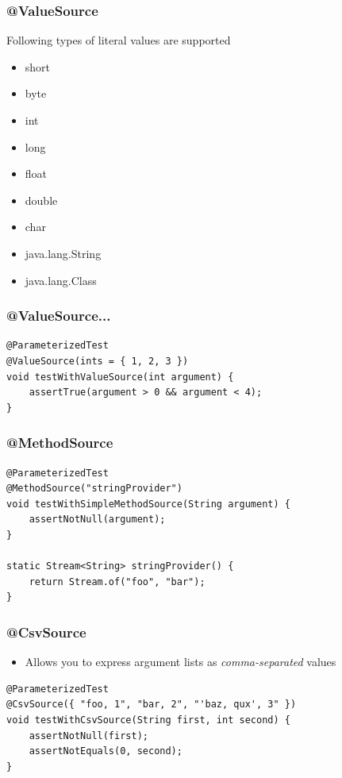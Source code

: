 \documentclass{beamer}
\begin{document}
\begin{frame}[fragile]
\frametitle{@ValueSource}
Following types of literal values are supported

\begin{itemize}
\item short
\item byte
\item int
\item long
\item float
\item double
\item char
\item java.lang.String
\item java.lang.Class
\end {itemize}
\end{frame}

\begin{frame}[fragile]
\frametitle{@ValueSource...}
\begin{example}
 \begin{lstlisting}
@ParameterizedTest
@ValueSource(ints = { 1, 2, 3 })
void testWithValueSource(int argument) {
    assertTrue(argument > 0 && argument < 4);
}
\end{lstlisting}
\end{example}
\end{frame}


\begin{frame}[fragile]
\frametitle{@MethodSource}
\begin{example}
 \begin{lstlisting}
@ParameterizedTest
@MethodSource("stringProvider")
void testWithSimpleMethodSource(String argument) {
    assertNotNull(argument);
}

static Stream<String> stringProvider() {
    return Stream.of("foo", "bar");
}
\end{lstlisting}
\end{example}
\end{frame}


\begin{frame}[fragile]
\frametitle{@CsvSource}

\begin{itemize}
\item Allows you to express argument lists as \textit{comma-separated} values
\end{itemize}

\begin{example}
 \begin{lstlisting}
@ParameterizedTest
@CsvSource({ "foo, 1", "bar, 2", "'baz, qux', 3" })
void testWithCsvSource(String first, int second) {
    assertNotNull(first);
    assertNotEquals(0, second);
}
\end{lstlisting}
\end{example}

\end{frame}
\end{document}
